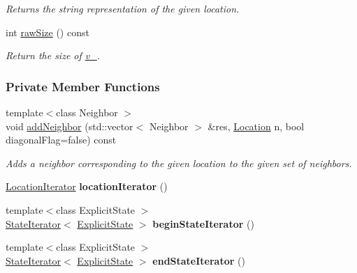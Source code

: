 \begin{DoxyCompactItemize}
\begin{DoxyCompactList}\small\item\em Returns the string representation of the given location. \end{DoxyCompactList}\item 
int \hyperlink{structslb_1_1ext_1_1explicit__space_1_1Grid_ae1dfa66a8c9f25eb20fa2baf8552876a}{raw\+Size} () const 
\begin{DoxyCompactList}\small\item\em Return the size of \hyperlink{structslb_1_1ext_1_1explicit__space_1_1Grid_aecb404c6bc75e985ee31a4fef89433d2}{v\+\_\+}. \end{DoxyCompactList}\end{DoxyCompactItemize}
\subsubsection*{Private Member Functions}
\begin{DoxyCompactItemize}
\item 
{\footnotesize template$<$class Neighbor $>$ }\\void \hyperlink{structslb_1_1ext_1_1explicit__space_1_1Grid_a804425c4377ce2933be9f3ea655dd940}{add\+Neighbor} (std\+::vector$<$ Neighbor $>$ \&res, \hyperlink{structslb_1_1ext_1_1explicit__space_1_1Grid_a2b2125f1774b299ea7f0f9f21d967fde}{Location} n, bool diagonal\+Flag=false) const 
\begin{DoxyCompactList}\small\item\em Adds a neighbor corresponding to the given location to the given set of neighbors. \end{DoxyCompactList}\item 
\hyperlink{structslb_1_1ext_1_1explicit__space_1_1Grid_a75c71647e997ddb8f8f442d4e173d962}{Location\+Iterator} {\bfseries location\+Iterator} ()\hypertarget{structslb_1_1ext_1_1explicit__space_1_1Grid_a0136e082c52c7d3c7334b64fd69f4985}{}\label{structslb_1_1ext_1_1explicit__space_1_1Grid_a0136e082c52c7d3c7334b64fd69f4985}

\item 
{\footnotesize template$<$class Explicit\+State $>$ }\\\hyperlink{structslb_1_1ext_1_1explicit__space_1_1Grid_1_1StateIterator}{State\+Iterator}$<$ \hyperlink{structslb_1_1core_1_1sb_1_1ExplicitState}{Explicit\+State} $>$ {\bfseries begin\+State\+Iterator} ()\hypertarget{structslb_1_1ext_1_1explicit__space_1_1Grid_ac672b9b4974011f4c10243a9c42e5e5e}{}\label{structslb_1_1ext_1_1explicit__space_1_1Grid_ac672b9b4974011f4c10243a9c42e5e5e}

\item 
{\footnotesize template$<$class Explicit\+State $>$ }\\\hyperlink{structslb_1_1ext_1_1explicit__space_1_1Grid_1_1StateIterator}{State\+Iterator}$<$ \hyperlink{structslb_1_1core_1_1sb_1_1ExplicitState}{Explicit\+State} $>$ {\bfseries end\+State\+Iterator} ()\hypertarget{structslb_1_1ext_1_1explicit__space_1_1Grid_a6652bd758225247b7bbc741461d4bf67}{}\label{structslb_1_1ext_1_1explicit__space_1_1Grid_a6652bd758225247b7bbc741461d4bf67}

\end{DoxyCompactItemize}
